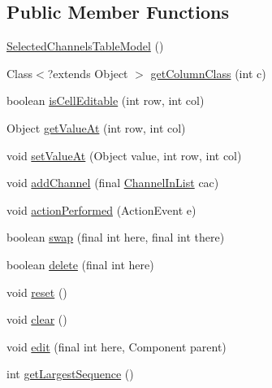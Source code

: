 \subsection*{Public Member Functions}
\begin{DoxyCompactItemize}
\item 
\hyperlink{classgov_1_1fnal_1_1ppd_1_1dd_1_1channel_1_1list_1_1table_1_1SelectedChannelsTableModel_a092efe9f1221d7f271c454d7b910e2be}{Selected\-Channels\-Table\-Model} ()
\item 
Class$<$?extends Object $>$ \hyperlink{classgov_1_1fnal_1_1ppd_1_1dd_1_1channel_1_1list_1_1table_1_1SelectedChannelsTableModel_a4309a29d07a7cd5aff870e6c9e991ecb}{get\-Column\-Class} (int c)
\item 
boolean \hyperlink{classgov_1_1fnal_1_1ppd_1_1dd_1_1channel_1_1list_1_1table_1_1SelectedChannelsTableModel_af27f38f128ef5b0b09f4438dff8b8b6c}{is\-Cell\-Editable} (int row, int col)
\item 
Object \hyperlink{classgov_1_1fnal_1_1ppd_1_1dd_1_1channel_1_1list_1_1table_1_1SelectedChannelsTableModel_a2e5ae1ac482230c4f6a1106a5837a3ee}{get\-Value\-At} (int row, int col)
\item 
void \hyperlink{classgov_1_1fnal_1_1ppd_1_1dd_1_1channel_1_1list_1_1table_1_1SelectedChannelsTableModel_afa88ade174ffaaa2711e87d43e03ad0c}{set\-Value\-At} (Object value, int row, int col)
\item 
void \hyperlink{classgov_1_1fnal_1_1ppd_1_1dd_1_1channel_1_1list_1_1table_1_1SelectedChannelsTableModel_a6d33f48664dd3d19c4547e76fe5f7b20}{add\-Channel} (final \hyperlink{classgov_1_1fnal_1_1ppd_1_1dd_1_1channel_1_1ChannelInList}{Channel\-In\-List} cac)
\item 
void \hyperlink{classgov_1_1fnal_1_1ppd_1_1dd_1_1channel_1_1list_1_1table_1_1SelectedChannelsTableModel_ae9015841439668435844739538e4efbb}{action\-Performed} (Action\-Event e)
\item 
boolean \hyperlink{classgov_1_1fnal_1_1ppd_1_1dd_1_1channel_1_1list_1_1table_1_1SelectedChannelsTableModel_a425682e41f6884211eeb8ac282aa20f6}{swap} (final int here, final int there)
\item 
boolean \hyperlink{classgov_1_1fnal_1_1ppd_1_1dd_1_1channel_1_1list_1_1table_1_1SelectedChannelsTableModel_ae93a046a5d3de36330302e02eb77e268}{delete} (final int here)
\item 
void \hyperlink{classgov_1_1fnal_1_1ppd_1_1dd_1_1channel_1_1list_1_1table_1_1SelectedChannelsTableModel_a18eb0afcee7ec9e06cab673fc5a9e83b}{reset} ()
\item 
void \hyperlink{classgov_1_1fnal_1_1ppd_1_1dd_1_1channel_1_1list_1_1table_1_1SelectedChannelsTableModel_a4827bcdd9d9c6287a9cde8abec7cb082}{clear} ()
\item 
void \hyperlink{classgov_1_1fnal_1_1ppd_1_1dd_1_1channel_1_1list_1_1table_1_1SelectedChannelsTableModel_a260df7c33ba7603f5b61de9fd6460a96}{edit} (final int here, Component parent)
\item 
int \hyperlink{classgov_1_1fnal_1_1ppd_1_1dd_1_1channel_1_1list_1_1table_1_1SelectedChannelsTableModel_a587affc6a89dab0a167a6eba68623314}{get\-Largest\-Sequence} ()
\end{DoxyCompactItemize}
